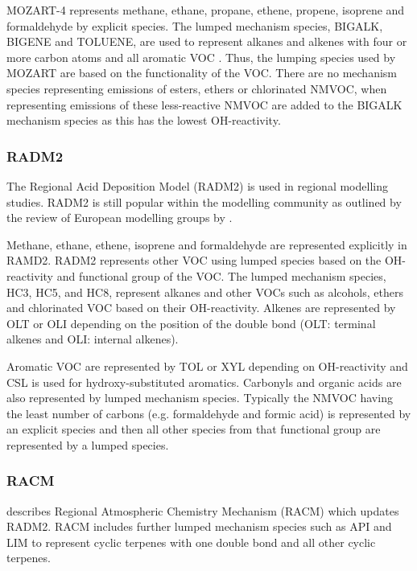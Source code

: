 MOZART-4 represents methane, ethane, propane, ethene, propene, isoprene and formaldehyde by explicit species.
The lumped mechanism species, BIGALK, BIGENE and TOLUENE, are used to represent alkanes and alkenes with four or more carbon atoms and all aromatic VOC \citep{Emmons:2010}.
Thus, the lumping species used by MOZART are based on the functionality of the VOC.
There are no mechanism species representing emissions of esters, ethers or chlorinated NMVOC, when representing emissions of these less-reactive NMVOC are added to the BIGALK mechanism species as this has the lowest OH-reactivity.


\subsubsection{RADM2}
The Regional Acid Deposition Model (RADM2) \citep{Stockwell:1990} is used in regional modelling studies.
RADM2 is still popular within the modelling community as outlined by the review of European modelling groups by \citet{Baklanov:2014}.

Methane, ethane, ethene, isoprene and formaldehyde are represented explicitly in RAMD2.
RADM2 represents other VOC using lumped species based on the OH-reactivity and functional group of the VOC.
The lumped mechanism species, HC3, HC5, and HC8, represent alkanes and other VOCs such as alcohols, ethers and  chlorinated VOC based on their OH-reactivity.
Alkenes are represented by OLT or OLI depending on the position of the double bond (OLT: terminal alkenes and OLI: internal alkenes).

Aromatic VOC are represented by TOL or XYL depending on OH-reactivity and CSL is used for hydroxy-substituted aromatics.
Carbonyls and organic acids are also represented by lumped mechanism species.
Typically the NMVOC having the least number of carbons (e.g. formaldehyde and formic acid) is represented by an explicit species and then all other species from that functional group are represented by a lumped species.

\subsubsection{RACM}
\citet{Stockwell:1997} describes Regional Atmospheric Chemistry Mechanism (RACM) which updates RADM2.
RACM includes further lumped mechanism species such as API and LIM to represent cyclic terpenes with one double bond and all other cyclic terpenes.

